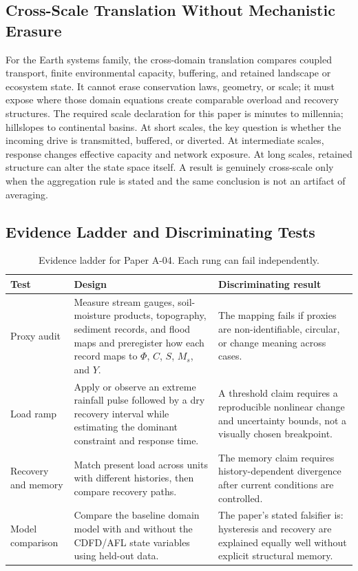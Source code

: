 \documentclass[11pt,a4paper]{article}
\begin{document}
\subsection{Cross-Scale Translation Without Mechanistic Erasure}

For the Earth systems family, the cross-domain translation compares coupled transport, finite environmental capacity, buffering, and retained landscape or ecosystem state. It cannot erase conservation laws, geometry, or scale; it must expose where those domain equations create comparable overload and recovery structures. \cite{Holling1973,Turing1952,BakTangWiesenfeld1987}
The required scale declaration for this paper is minutes to millennia; hillslopes to continental basins. At short
scales, the key question is whether the incoming drive is transmitted,
buffered, or diverted. At intermediate scales, response changes effective
capacity and network exposure. At long scales, retained structure can alter the
state space itself. A result is genuinely cross-scale only when the aggregation
rule is stated and the same conclusion is not an artifact of averaging.

\subsection{Evidence Ladder and Discriminating Tests}

\begin{table}[htbp]
\centering
\small
\caption{Evidence ladder for Paper A-04. Each rung can fail independently.}
\begin{tabularx}{\textwidth}{|p{}|X|X|}
\hline
\textbf{Test} & \textbf{Design} & \textbf{Discriminating result} \\
\hline
Proxy audit & Measure stream gauges, soil-moisture products, topography, sediment records, and flood maps and preregister how each record maps to $\Phi$, $C$, $S$, $M_s$, and $Y$. & The mapping fails if proxies are non-identifiable, circular, or change meaning across cases. \\
\hline
Load ramp & Apply or observe an extreme rainfall pulse followed by a dry recovery interval while estimating the dominant constraint and response time. & A threshold claim requires a reproducible nonlinear change and uncertainty bounds, not a visually chosen breakpoint. \\
\hline
Recovery and memory & Match present load across units with different histories, then compare recovery paths. & The memory claim requires history-dependent divergence after current conditions are controlled. \\
\hline
Model comparison & Compare the baseline domain model with and without the CDFD/AFL state variables using held-out data. & The paper's stated falsifier is: hysteresis and recovery are explained equally well without explicit structural memory. \\
\hline
\end{tabularx}
\end{table}
\end{document}
